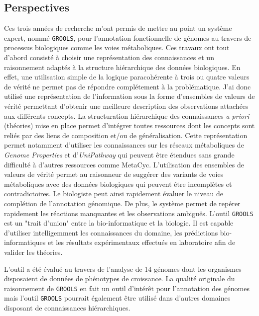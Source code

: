 \begin{refsegment}
\chapter*{Perspectives}

Ces trois années de recherche m'ont permis de mettre au point un système expert, nommé \texttt{\gls{GROOLS}}, pour l'annotation fonctionnelle de génomes au travers de processus biologiques comme les voies métaboliques. Ces travaux ont tout d'abord consisté à choisir une représentation des connaissances et un raisonnement adaptés à la structure hiérarchique des données biologiques. En effet, une utilisation simple de la logique paracohérente à trois ou quatre valeurs de vérité ne permet pas de répondre complétement à la problématique. J'ai donc utilisé une représentation de l'information sous la forme d'ensembles de valeurs de vérité permettant d'obtenir une meilleure description des observations attachées aux différents concepts. La structuration hiérarchique des connaissances \textit{a priori} (théories) mise en place permet d'intégrer toutes ressources dont les concepts sont reliés par des liens de composition et/ou de généralisation. Cette représentation permet notamment d'utiliser les connaissances sur les réseaux métaboliques  de \textit{Genome Properties} et d'\textit{UniPathway} qui peuvent être étendues sans grande difficulté à d'autres ressources comme MetaCyc. L'utilisation des ensembles de valeurs de vérité permet au raisonneur de suggérer des variants de voies métaboliques avec des données biologiques qui peuvent être incomplètes et contradictoires. Le biologiste peut ainsi rapidement évaluer le niveau de complétion de l'annotation génomique. De plus, le système permet de repérer rapidement les réactions manquantes et les observations ambiguës. L'outil \texttt{GROOLS} est un "trait d'union" entre la bio-informatique et la biologie. Il est capable d'utiliser intelligemment les connaissances du domaine, les prédictions bio-informatiques et les résultats expérimentaux effectués en laboratoire afin de valider les théories.

L'outil a été évalué au travers de l'analyse de 14 génomes dont les organismes disposaient de données de phénotypes de croissance. La qualité originale du raisonnement de \texttt{\gls{GROOLS}} en fait un outil d'intérêt pour l'annotation des génomes mais l'outil \texttt{\gls{GROOLS}} pourrait également être utilisé dans d'autres domaines disposant de connaissances hiérarchiques.


\end{refsegment}
